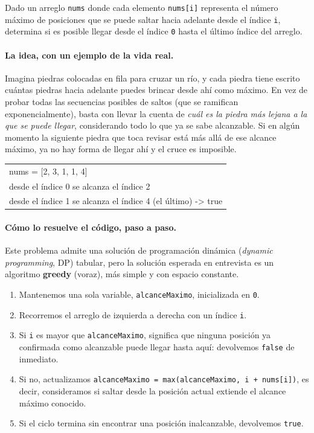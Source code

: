 
Dado un arreglo \texttt{nums} donde cada elemento \texttt{nums[i]}
representa el número máximo de posiciones que se puede saltar hacia
adelante desde el índice \texttt{i}, determina si es posible llegar desde el
índice \texttt{0} hasta el último índice del arreglo.

\paragraph{La idea, con un ejemplo de la vida real.} Imagina piedras
colocadas en fila para cruzar un río, y cada piedra tiene escrito cuántas
piedras hacia adelante puedes brincar desde ahí como máximo. En vez de
probar todas las secuencias posibles de saltos (que se ramifican
exponencialmente), basta con llevar la cuenta de \emph{cuál es la piedra más
lejana a la que se puede llegar}, considerando todo lo que ya se sabe
alcanzable. Si en algún momento la siguiente piedra que toca revisar está
más allá de ese alcance máximo, ya no hay forma de llegar ahí y el cruce es
imposible.

\begin{center}
\ttfamily
\begin{tabular}{l}
nums = [2, 3, 1, 1, 4]\\
desde el índice 0 se alcanza el índice 2\\
desde el índice 1 se alcanza el índice 4 (el último) -> true\\
\end{tabular}
\end{center}

\paragraph{Cómo lo resuelve el código, paso a paso.} Este problema admite
una solución de programación dinámica (\emph{dynamic programming}, DP)
tabular, pero la solución esperada en entrevista es un algoritmo
\textbf{greedy} (voraz), más simple y con espacio constante.
\begin{enumerate}
  \item Mantenemos una sola variable, \texttt{alcanceMaximo}, inicializada
        en \texttt{0}.
  \item Recorremos el arreglo de izquierda a derecha con un índice
        \texttt{i}.
  \item Si \texttt{i} es mayor que \texttt{alcanceMaximo}, significa que
        ninguna posición ya confirmada como alcanzable puede llegar hasta
        aquí: devolvemos \texttt{false} de inmediato.
  \item Si no, actualizamos \texttt{alcanceMaximo = max(alcanceMaximo, i +
        nums[i])}, es decir, consideramos si saltar desde la posición actual
        extiende el alcance máximo conocido.
  \item Si el ciclo termina sin encontrar una posición inalcanzable,
        devolvemos \texttt{true}.
\end{enumerate}

